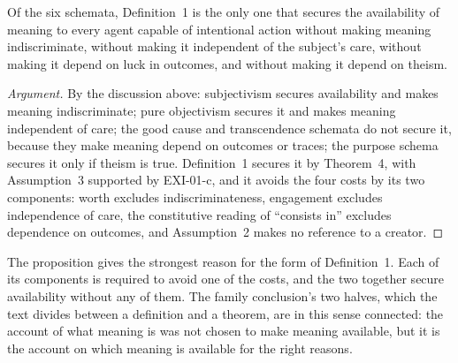 \begin{proposition}\label{p:availcost}
Of the six schemata, Definition~1 is the only one that secures the availability of meaning to every agent capable of intentional action without making meaning indiscriminate, without making it independent of the subject's care, without making it depend on luck in outcomes, and without making it depend on theism.
\end{proposition}

\begin{proof}[Argument]
By the discussion above: subjectivism secures availability and makes meaning indiscriminate; pure objectivism secures it and makes meaning independent of care; the good cause and transcendence schemata do not secure it, because they make meaning depend on outcomes or traces; the purpose schema secures it only if theism is true. Definition~1 secures it by Theorem~4, with Assumption~3 supported by EXI-01-c, and it avoids the four costs by its two components: worth excludes indiscriminateness, engagement excludes independence of care, the constitutive reading of \enquote{consists in} excludes dependence on outcomes, and Assumption~2 makes no reference to a creator.
\end{proof}

The proposition gives the strongest reason for the form of Definition~1. Each of its components is required to avoid one of the costs, and the two together secure availability without any of them. The family conclusion's two halves, which the text divides between a definition and a theorem, are in this sense connected: the account of what meaning is was not chosen to make meaning available, but it is the account on which meaning is available for the right reasons.
